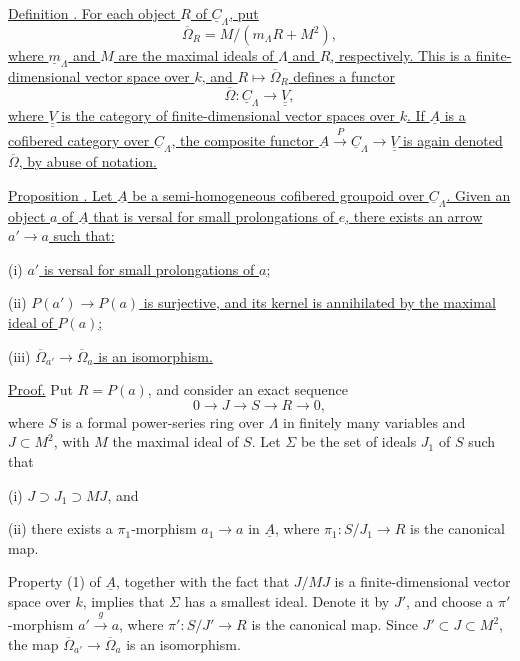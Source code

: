 
\underline{Definition . For each object $R$ of
$\underline C_\Lambda$, put}
\[
 \overline\Omega_R=M/(m_\Lambda R+M^2),
\]
\underline{where }$\underline{m}_\Lambda$\underline{ and $M$ are the maximal ideals of
$\Lambda$ and $R$, respectively. This is a finite-dimensional vector
space over $k$, and $R\longmapsto\overline\Omega_R$ defines a functor}
\[
 \overline\Omega:\underline C_\Lambda
   \longrightarrow\underline{\underline V},
\]
\underline{where $\underline{\underline V}$ is the category of
finite-dimensional vector spaces over $k$. If $\underline A$ is a
cofibered category over $\underline C_\Lambda$, the composite functor
$\underline A\xrightarrow P\underline C_\Lambda
\longrightarrow\underline{\underline V}$ is again denoted
$\overline\Omega$, by abuse of notation.}

\underline{Proposition . Let $\underline A$ be a semi-homogeneous
cofibered groupoid over $\underline C_\Lambda$. Given an object $a$ of
$\underline A$ that is versal for small prolongations of $e$, there
exists an arrow $a'\longrightarrow a$ such that:}


(i) \underline{$a'$ is versal for small prolongations of $a$;}

(ii) \underline{$P(a')\longrightarrow P(a)$ is surjective, and its
kernel is annihilated by the maximal ideal of $P(a)$;}

(iii) \underline{$\overline\Omega_{a'}\longrightarrow
\overline\Omega_a$ is an isomorphism.}

\underline{Proof.} Put $R=P(a)$, and consider an exact sequence
\[
 0\longrightarrow J\longrightarrow S\longrightarrow R
 \longrightarrow0,
\]
where $S$ is a formal power-series ring over $\Lambda$ in finitely
many variables and $J\subset M^2$, with $M$ the maximal ideal of $S$.
Let $\Sigma$ be the set of ideals $J_1$ of $S$ such that

(i) $J\supset J_1\supset MJ$, and

(ii) there exists a $\pi_1$-morphism $a_1\longrightarrow a$ in
$\underline A$, where $\pi_1:S/J_1\longrightarrow R$ is the canonical
map.

Property (1) of $\underline A$, together with the fact that $J/MJ$
is a finite-dimensional vector space over $k$, implies that $\Sigma$
has a smallest ideal. Denote it by $J'$, and choose a
$\pi'$-morphism $a'\xrightarrow g a$, where
$\pi':S/J'\longrightarrow R$ is the canonical map. Since
$J'\subset J\subset M^2$, the map
$\overline\Omega_{a'}\longrightarrow\overline\Omega_a$ is an
isomorphism.

